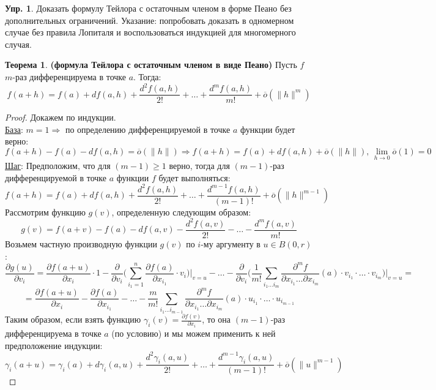 \documentclass[12pt]{article}
\theoremstyle{definition}
\newtheorem{exrc}{Упр.}
\newtheorem{theorem}{Теорема}
\begin{document}
\begin{exrc}
	Доказать формулу Тейлора с остаточным членом в форме Пеано без дополнительных ограничений. Указание: попробовать доказать в одномерном случае без правила Лопиталя и воспользоваться индукцией для многомерного случая.
\end{exrc}
\begin{theorem}\textbf{(формула Тейлора с остаточным членом в виде Пеано)}
	Пусть $f$ $m$-раз дифференцируема в точке $a$. Тогда:
	$$
		f(a+h) = f(a) + df(a,h) + \dfrac{d^2f(a,h)}{2!} + \dotsc + \dfrac{d^mf(a,h)}{m!} + \overline{o}(\|h\|^m)
	$$
\end{theorem}
\begin{proof}
	Докажем по индукции.\\
	\uline{База}: $m = 1 \Rightarrow $ по определению дифференцируемой в точке $a$ функции будет верно:
	$$
		f(a + h) - f(a) - df(a,h) = \overline{o}(\|h\|) \Rightarrow f(a+h) = f(a) + df(a,h) + \overline{o}(\|h\|), \, \lim\limits_{h \to 0} \overline{o}(1) = 0
	$$ 
	\uline{Шаг}: Предположим, что для $(m-1) \geq 1$ верно, тогда для $(m-1)$-раз дифференцируемой в точке $a$ функции $f$ будет выполняться:
	$$
		f(a+h) = f(a) + df(a,h) + \dfrac{d^2f(a,h)}{2!} + \dotsc + \dfrac{d^{m-1}f(a,h)}{(m-1)!} + \overline{o}(\|h\|^{m-1})
	$$
	Рассмотрим функцию $g(v)$, определенную следующим образом:
	$$
		g(v) = f(a+v) - f(a) - df(a,v) - \dfrac{d^2f(a,v)}{2!} - \dotsc - \dfrac{d^mf(a,v)}{m!}
	$$
	Возьмем частную производную функции $g(v)$ по $i$-му аргументу в $u \in B(0,r)$:
	$$
		\dfrac{\partial g(u)}{\partial v_i} = \dfrac{\partial f(a + u)}{\partial x_i}{\cdot}1 - \dfrac{\partial}{\partial v_i}\bigg(\displaystyle \sum\limits_{i_1 = 1}^{n} \dfrac{\partial f(a)}{\partial x_{i_1}}{\cdot}v_i\bigg)\bigg|_{v = u} - \dotsc - \dfrac{\partial}{\partial v_i}\bigg(\dfrac{1}{m!}\displaystyle \sum\limits_{i_1 \dotsc i_m}\dfrac{\partial^m f}{\partial x_{i_1} \dotsc \partial x_{i_m}}(a){\cdot}v_{i_1}{\cdot}\dotsc{\cdot}v_{i_m}\bigg)\bigg|_{v = u} = 
	$$
	$$
		= \dfrac{\partial f(a + u)}{\partial x_i} - \dfrac{\partial f(a)}{\partial x_{i_1}} - \dotsc - \dfrac{m}{m!}\displaystyle \sum\limits_{i_1 \dotsc i_{m-1}}\dfrac{\partial^m f}{\partial x_{i_1} \dotsc \partial x_{i_m}}(a){\cdot}u_{i_1}{\cdot}\dotsc{\cdot}u_{i_{m-1}}
	$$
	Таким образом, если взять функцию $\gamma_i(v) = \tfrac{\partial f(v)}{\partial x_i}$, то она $(m-1)$-раз дифференцируема в точке $a$ (по условию) и мы можем применить к ней предположение индукции:
	$$
		\gamma_i(a+u) = \gamma_i(a) + d\gamma_i(a,u) + \dfrac{d^2\gamma_i(a,u)}{2!} + \dotsc + \dfrac{d^{m-1}\gamma_i(a,u)}{(m-1)!} + \overline{o}(\|u\|^{m-1})
$$
\end{proof}
\end{document}
